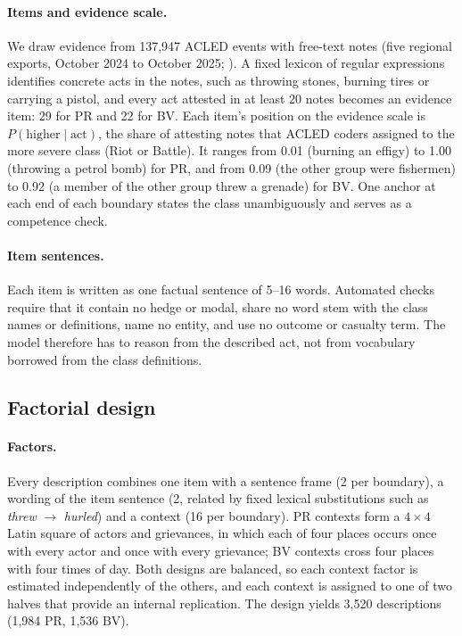 \documentclass[11pt]{article}
\begin{document}
\paragraph{Items and evidence scale.}
We draw evidence from 137,947 ACLED events with free-text notes (five regional exports, October 2024 to October 2025; \citealp{raleigh-etal-2010-acled}). A fixed lexicon of regular expressions identifies concrete acts in the notes, such as throwing stones, burning tires or carrying a pistol, and every act attested in at least 20 notes becomes an evidence item: 29 for PR and 22 for BV. Each item's position on the evidence scale is $P(\text{higher}\mid\text{act})$, the share of attesting notes that ACLED coders assigned to the more severe class (Riot or Battle). It ranges from 0.01 (burning an effigy) to 1.00 (throwing a petrol bomb) for PR, and from 0.09 (the other group were fishermen) to 0.92 (a member of the other group threw a grenade) for BV. One anchor at each end of each boundary states the class unambiguously and serves as a competence check.

\paragraph{Item sentences.}
Each item is written as one factual sentence of 5--16 words. Automated checks require that it contain no hedge or modal, share no word stem with the class names or definitions, name no entity, and use no outcome or casualty term. The model therefore has to reason from the described act, not from vocabulary borrowed from the class definitions.

\subsection{Factorial design}

\paragraph{Factors.}
Every description combines one item with a sentence frame (2 per boundary), a wording of the item sentence (2, related by fixed lexical substitutions such as \emph{threw} $\rightarrow$ \emph{hurled}) and a context (16 per boundary). PR contexts form a $4\times4$ Latin square of actors and grievances, in which each of four places occurs once with every actor and once with every grievance; BV contexts cross four places with four times of day. Both designs are balanced, so each context factor is estimated independently of the others, and each context is assigned to one of two halves that provide an internal replication. The design yields 3,520 descriptions (1,984 PR, 1,536 BV).
\end{document}
